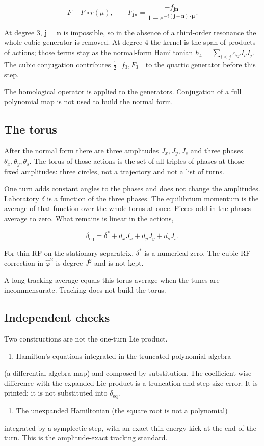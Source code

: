 \documentclass[11pt,a4paper]{article}
\begin{document}
\[
F-F\circ r(\mu),\qquad
F_{\mathbf{j}\mathbf{n}}=\frac{-f_{\mathbf{j}\mathbf{n}}}{1-e^{-i(\mathbf{j}-\mathbf{n})\cdot\boldsymbol{\mu}}}.
\]

At degree 3, $\mathbf{j}=\mathbf{n}$ is impossible, so in the absence of
a third-order resonance the whole cubic generator is removed. At degree 4
the kernel is the span of products of actions; those terms stay as the
normal-form Hamiltonian $h_4=\sum_{i\le j}c_{ij}J_i J_j$. The cubic
conjugation contributes $\tfrac12[f_3,F_3]$ to the quartic generator
before this step.

The homological operator is applied to the generators. Conjugation of a
full polynomial map is not used to build the normal form.

\subsection{The torus}

After the normal form there are three amplitudes $J_x,J_y,J_s$ and three
phases $\theta_x,\theta_y,\theta_s$. The torus of those actions is the set
of all triples of phases at those fixed amplitudes: three circles, not a
trajectory and not a list of turns.

One turn adds constant angles to the phases and does not change the
amplitudes. Laboratory $\delta$ is a function of the three phases. The
equilibrium momentum is the average of that function over the whole torus
at once. Pieces odd in the phases average to zero. What remains is linear
in the actions,

\[
\delta_{\mathrm{eq}}=\delta^\ast+d_x J_x+d_y J_y+d_s J_s.
\]

For thin RF on the stationary separatrix, $\delta^\ast$ is a numerical
zero. The cubic-RF correction in $\hat\varphi^2$ is degree $J^2$ and is
not kept.

A long tracking average equals this torus average when the tunes are
incommensurate. Tracking does not build the torus.

\subsection{Independent checks}

Two constructions are not the one-turn Lie product.

\begin{enumerate}
\item Hamilton's equations integrated in the truncated polynomial algebra
\end{enumerate}
   (a differential-algebra map) and composed by substitution. The
   coefficient-wise difference with the expanded Lie product is a
   truncation and step-size error. It is printed; it is not substituted
   into $\delta_{\mathrm{eq}}$.
\begin{enumerate}
\item The unexpanded Hamiltonian (the square root is not a polynomial)
\end{enumerate}
   integrated by a symplectic step, with an exact thin energy kick at the
   end of the turn. This is the amplitude-exact tracking standard.
\end{document}
